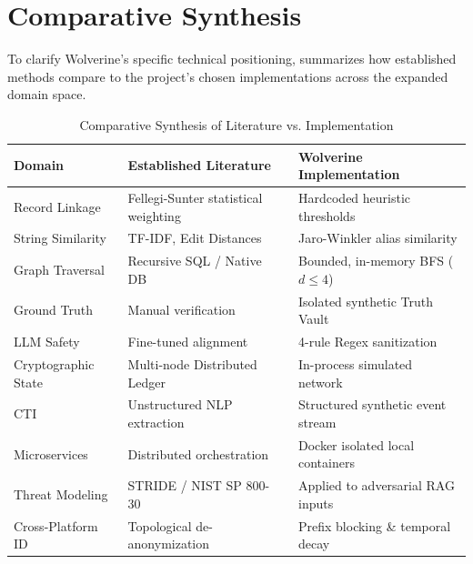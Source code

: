 \section{Comparative Synthesis}
\label{sec:related-comparative-synthesis}
To clarify Wolverine's specific technical positioning,  summarizes how established methods compare to the project's chosen implementations across the expanded domain space.

\begin{table}[h]
\centering
\begin{tabular}{p{} p{} p{}}
\toprule
\textbf{Domain} & \textbf{Established Literature} & \textbf{Wolverine Implementation} \\
\midrule
Record Linkage & Fellegi-Sunter statistical weighting~\cite{fellegi1969theory, elmagarmid2007duplicate} & Hardcoded heuristic thresholds \\
\addlinespace
String Similarity & TF-IDF, Edit Distances~\cite{cohen2003comparison} & Jaro-Winkler alias similarity \\
\addlinespace
Graph Traversal & Recursive SQL / Native DB~\cite{newman2003structure} & Bounded, in-memory BFS ($d \le 4$) \\
\addlinespace
Ground Truth & Manual verification & Isolated synthetic Truth Vault \\
\addlinespace
LLM Safety & Fine-tuned alignment~\cite{liu2024formalizing} & 4-rule Regex sanitization \\
\addlinespace
Cryptographic State & Multi-node Distributed Ledger~\cite{castro2002practical} & In-process simulated network \\
\addlinespace
CTI & Unstructured NLP extraction~\cite{liao2016acing} & Structured synthetic event stream \\
\addlinespace
Microservices & Distributed orchestration~\cite{newman2021building} & Docker isolated local containers \\
\addlinespace
Threat Modeling & STRIDE / NIST SP 800-30~\cite{shostack2014threat} & Applied to adversarial RAG inputs \\
\addlinespace
Cross-Platform ID & Topological de-anonymization~\cite{narayanan2008robust} & Prefix blocking \& temporal decay \\
\bottomrule
\end{tabular}
\caption{Comparative Synthesis of Literature vs. Implementation}
\label{tab:literature-comparison}
\end{table}
